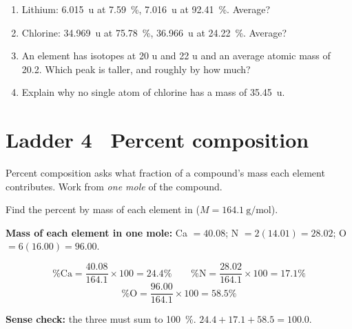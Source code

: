 \documentclass{apchem-worksheet}
\begin{document}
\begin{yourturn}
\begin{enumerate}[leftmargin=*,itemsep=0.5em]
  \item Lithium: \SI{6.015}{\atomicmassunit} at \SI{7.59}{\percent},
        \SI{7.016}{\atomicmassunit} at \SI{92.41}{\percent}. Average?
        \workspace[1.6cm]
  \item Chlorine: \SI{34.969}{\atomicmassunit} at \SI{75.78}{\percent},
        \SI{36.966}{\atomicmassunit} at \SI{24.22}{\percent}. Average?
        \workspace[1.6cm]
  \item An element has isotopes at 20 u and 22 u and an average atomic
        mass of \num{20.2}. Which peak is taller, and roughly by how much?
        \workspace[1.6cm]
  \item Explain why no single atom of chlorine has a mass of
        \SI{35.45}{\atomicmassunit}. \workspace[1.8cm]
\end{enumerate}
\end{yourturn}

\section*{\sffamily Ladder 4 \textbullet\ Percent composition}

Percent composition asks what fraction of a compound's mass each element
contributes. Work from \emph{one mole} of the compound.

\begin{workedexample}
Find the percent by mass of each element in 
($M = \SI{164.1}{\gram\per\mole}$).

\textbf{Mass of each element in one mole:}
Ca $= 40.08$; \quad N $= 2(14.01) = 28.02$; \quad
O $= 6(16.00) = 96.00$.

\[ \%\text{Ca} = \frac{40.08}{164.1}\times100 = \mathbf{24.4\%} \qquad
   \%\text{N} = \frac{28.02}{164.1}\times100 = \mathbf{17.1\%} \]
\[ \%\text{O} = \frac{96.00}{164.1}\times100 = \mathbf{58.5\%} \]

\textbf{Sense check:} the three must sum to \SI{100}{\percent}.
$24.4 + 17.1 + 58.5 = 100.0$. \checkmark
\end{workedexample}
\end{document}
